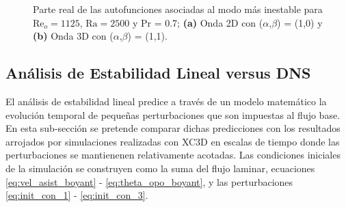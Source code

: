 \begin{figure}[H]
 \centering
 	\caption{Parte real de las autofunciones asociadas al modo más inestable para $\text{Re}_o=1125$, $\text{Ra}=2500$ y Pr = 0.7; \textbf{(a)} Onda 2D con ($\alpha$,$\beta$) = (1,0) y \textbf{(b)} Onda 3D con ($\alpha$,$\beta$) = (1,1).} 
 \label{fig:eigenfun_valid}
\end{figure}

\subsection{Análisis de Estabilidad Lineal versus DNS}

El análisis de estabilidad lineal predice a través de un modelo matemático la evolución temporal de pequeñas perturbaciones que son impuestas al flujo base. En esta sub-sección se pretende comparar dichas predicciones con los resultados arrojados por simulaciones realizadas con XC3D en escalas de tiempo donde las perturbaciones se mantienenen relativamente acotadas. Las condiciones iniciales de la simulación se construyen como la suma del flujo laminar, ecuaciones \ref{eq:vel_asist_boyant} - \ref{eq:theta_opo_boyant}, y las perturbaciones \ref{eq:init_con_1} - \ref{eq:init_con_3}. 

